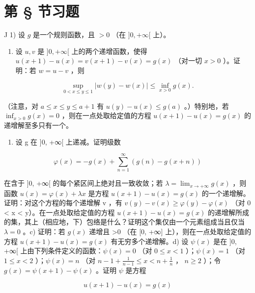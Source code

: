 \section*{第 \S{} 节习题}
{}

J 1) 设 \(g\) 是一个规则函数，且 \(>0\) （在 \(]0, +\infty[\) 上）。

\begin{enumerate}
\def\labelenumi{\alph{enumi})}
\tightlist
\item
  设 \(u, v\) 是 \(]0, +\infty[\) 上的两个递增函数，使得 \(u(x + 1) - u(x) = v(x + 1) - v(x) = g(x)\) （对一切 \(x > 0\) ）。证明：若 \(w = u - v\) ，则
\end{enumerate}

\[
\sup _ {0 <   x \leqslant y \leqslant 1} | w (y) - w (x) | \leqslant \inf _ {x > 0} g (x).
\]

（注意，对 \(a \leqslant x \leqslant y \leqslant a + 1\) 有 \(u(y) - u(x) \leqslant g(a)\) 。）特别地，若 \(\inf_{x > 0} g(x) = 0\) ，则在一点处取给定值的方程 \(u(x + 1) - u(x) = g(x)\) 的递增解至多只有一个。

\begin{enumerate}
\def\labelenumi{\alph{enumi})}
\setcounter{enumi}{1}
\tightlist
\item
  设 g 在 {]}0, +∞{[} 上递减。证明级数
\end{enumerate}

\[
\varphi (x) = - g (x) + \sum_ {n = 1} ^ {\infty} (g (n) - g (x + n))
\]

在含于 {]}0, +∞{[} 的每个紧区间上绝对且一致收敛；若 \(\lambda = \lim_{x \to +\infty} g(x)\) ，则函数 \(u(x) = \varphi(x) + \lambda x\) 是方程 \(u(x+1) - u(x) = g(x)\) 的一个递增解。证明：对这个方程的每个递增解 v ，有 \(v(y) - v(x) \geqslant \varphi(y) - \varphi(x)\) （对 0 \textless{} x \textless{} y）。在一点处取给定值的方程 \(u(x+1) - u(x) = g(x)\) 的递增解所成的集，其上（相应地，下）包络是什么？证明这个集仅由一个元素组成当且仅当 \(\lambda = 0\) 。c) 证明：若 \(g(x)\) 递增且 \textgreater0 （在 {[}0, +∞{]} 上），则在一点处取给定值的方程 \(u(x+1) - u(x) = g(x)\) 有无穷多个递增解。d) 设 \(\psi(x)\) 是在 {]}0, +∞{[} 上由下列条件定义的函数：\(\psi(x)=0\) （对 \(0\leqslant x<1\) ）；\(\psi(x)=1\) （对 \(1\leqslant x<2\) ）；\(\psi(x)=n\) （对 \(n-1+\frac{1}{n-1}\leqslant x<n+\frac{1}{n}\) ， \(n\geqslant2\) ）；令 \(g(x)=\psi(x+1)-\psi(x)\) 。证明 \(\psi\) 是方程

\[
u (x + 1) - u (x) = g (x)
\]

